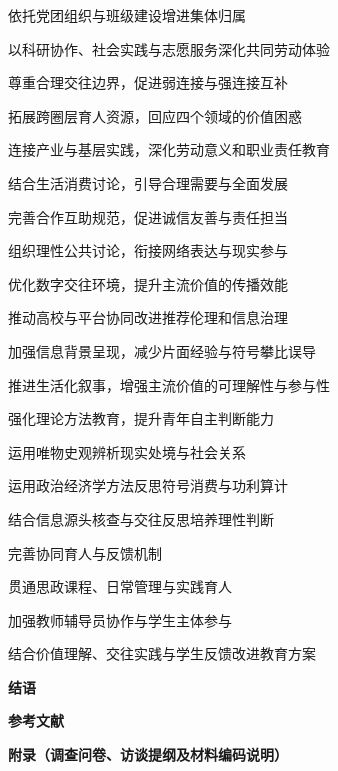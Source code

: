 \begin{thesisframework}
\begin{thesisoutline}
\begin{thesisoutline}
\begin{thesisoutline}
      \item 依托党团组织与班级建设增进集体归属
      \item 以科研协作、社会实践与志愿服务深化共同劳动体验
      \item 尊重合理交往边界，促进弱连接与强连接互补
    \end{thesisoutline}
    \item 拓展跨圈层育人资源，回应四个领域的价值困惑
    \begin{thesisoutline}
      \item 连接产业与基层实践，深化劳动意义和职业责任教育
      \item 结合生活消费讨论，引导合理需要与全面发展
      \item 完善合作互助规范，促进诚信友善与责任担当
      \item 组织理性公共讨论，衔接网络表达与现实参与
    \end{thesisoutline}
    \item 优化数字交往环境，提升主流价值的传播效能
    \begin{thesisoutline}
      \item 推动高校与平台协同改进推荐伦理和信息治理
      \item 加强信息背景呈现，减少片面经验与符号攀比误导
      \item 推进生活化叙事，增强主流价值的可理解性与参与性
    \end{thesisoutline}
    \item 强化理论方法教育，提升青年自主判断能力
    \begin{thesisoutline}
      \item 运用唯物史观辨析现实处境与社会关系
      \item 运用政治经济学方法反思符号消费与功利算计
      \item 结合信息源头核查与交往反思培养理性判断
    \end{thesisoutline}
    \item 完善协同育人与反馈机制
    \begin{thesisoutline}
      \item 贯通思政课程、日常管理与实践育人
      \item 加强教师辅导员协作与学生主体参与
      \item 结合价值理解、交往实践与学生反馈改进教育方案
    \end{thesisoutline}
  \end{thesisoutline}
\end{thesisoutline}
\par\noindent\textbf{结语}
\par\noindent\textbf{参考文献}
\par\noindent\textbf{附录（调查问卷、访谈提纲及材料编码说明）}
\end{thesisframework}

